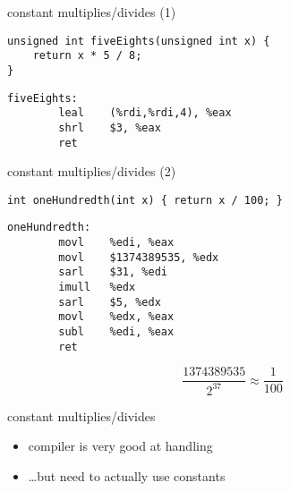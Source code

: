 \begin{frame}[fragile,label=constMultDiv1]{constant multiplies/divides (1)}
\begin{lstlisting}
unsigned int fiveEights(unsigned int x) {
    return x * 5 / 8;
}
\end{lstlisting}
\hrulefill
{}
\begin{lstlisting}
fiveEights:
        leal    (%rdi,%rdi,4), %eax
        shrl    $3, %eax
        ret
\end{lstlisting}
\end{frame}

\begin{frame}[fragile,label=constMultDiv2]{constant multiplies/divides (2)}
\begin{lstlisting}
int oneHundredth(int x) { return x / 100; }
\end{lstlisting}
\hrulefill
{}
\begin{lstlisting}
oneHundredth:
        movl    %edi, %eax
        movl    $1374389535, %edx
        sarl    $31, %edi
        imull   %edx
        sarl    $5, %edx
        movl    %edx, %eax
        subl    %edi, %eax
        ret
\end{lstlisting}
\[
\frac{1374389535}{2^{37}} \approx \frac{1}{100}
\]
\end{frame}

\begin{frame}{constant multiplies/divides}
    \begin{itemize}
    \item compiler is very good at handling
    \item \ldots but need to actually use constants
    \end{itemize}
\end{frame}

